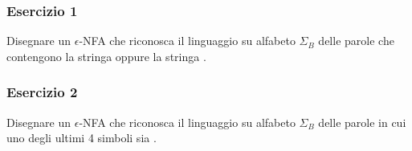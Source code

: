 \begin{frame}
\frametitle{Esercizio 1}
Disegnare un $\epsilon$-NFA che riconosca il linguaggio su alfabeto $\Sigma_{B}$ delle parole che contengono la stringa
\zero\uno oppure la stringa \uno\zero\zero.
\end{frame}

\begin{frame}
\frametitle{Esercizio 2}
Disegnare un $\epsilon$-NFA che riconosca il linguaggio su alfabeto $\Sigma_{B}$ delle parole in cui uno degli ultimi 4 simboli
sia \zero.
\end{frame}


